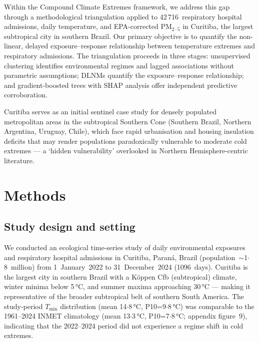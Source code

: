 \documentclass[review,number]{elsarticle}
\begin{document}
Within the Compound Climate Extremes
framework,\cite{Zscheischler2020} we address this gap through a
methodological triangulation applied to 42\,716~respiratory hospital
admissions, daily temperature, and EPA-corrected $\text{PM}_{2{\cdot}5}$ in
Curitiba, the largest subtropical city in southern Brazil. Our primary
objective is to quantify the non-linear, delayed exposure--response
relationship between temperature extremes and respiratory admissions.
The triangulation proceeds in three stages: unsupervised clustering
identifies environmental regimes and lagged associations without
parametric assumptions; DLNMs quantify the exposure--response relationship; and gradient-boosted trees with SHAP analysis offer
independent predictive corroboration.

Curitiba serves as an initial sentinel case study for densely
populated metropolitan areas
in the subtropical Southern Cone (Southern Brazil, Northern Argentina,
Uruguay, Chile), which face rapid urbanisation and housing insulation
deficits that may render populations paradoxically vulnerable to
moderate cold extremes --- a `hidden vulnerability' overlooked in
Northern Hemisphere-centric
literature.\cite{Gasparrini2015,Cohen2017}

\section{Methods}

\subsection{Study design and setting}

We conducted an ecological time-series study of daily environmental
exposures and respiratory hospital admissions in Curitiba, Paraná,
Brazil (population~$\sim$1${\cdot}$8~million) from
1~January~2022 to 31~December~2024 (1096~days). Curitiba is the
largest city in southern Brazil with a Köppen Cfb (subtropical)
climate, winter minima below 5\,°C, and summer maxima approaching
30\,°C --- making it representative of the broader subtropical belt
of southern South America. The study-period $T_\mathrm{min}$
distribution (mean 14${\cdot}$8\,°C, P10=9${\cdot}$8\,°C) was
comparable to the 1961--2024 INMET climatology (mean 13${\cdot}$3\,°C,
P10=7${\cdot}$8\,°C; appendix figure~9), indicating that the 2022--2024
period did not experience a regime shift in cold extremes.
\end{document}
